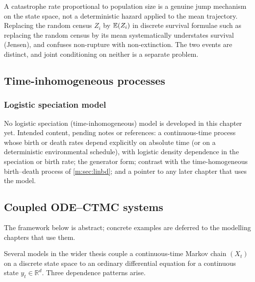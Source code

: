 \begin{remark}
\label{m:rem:catastrophe-not-meanfield}
A catastrophe rate proportional to population size is a genuine jump mechanism on
the state space, not a deterministic hazard applied to the mean trajectory. Replacing
the random census $Z_i$ by $\mathbb{E}\!\left(Z_i\right)$ in discrete survival formulae such as
replacing the random census by its mean systematically understates survival (Jensen), and confuses
non-rupture with non-extinction. The two events are distinct, and joint
conditioning on neither is a separate problem.
\end{remark}


\subsection{Time-inhomogeneous processes}
\label{m:sec:time-inhom}

\subsubsection{Logistic speciation model}
\label{m:sec:logistic-speciation}

\begin{remark}
\label{m:rem:logistic-todo}
No logistic speciation (time-inhomogeneous) model is developed in this chapter yet.
Intended content, pending notes or references: a continuous-time process whose birth
or death rates depend explicitly on absolute time (or on a deterministic environmental
schedule), with logistic density dependence in the speciation or birth rate; the
generator form; contrast with the time-homogeneous birth--death process of
\cref{m:sec:linbd}; and a pointer to any later chapter that uses the model.
\end{remark}

\subsection{Coupled ODE--CTMC systems}
\label{m:sec:coupled}

\begin{remark}
\label{m:rem:coupled-todo}
The framework below is abstract; concrete examples are deferred to the modelling
chapters that use them.
\end{remark}

Several models in the wider thesis couple a continuous-time Markov chain \((X_t)\) on
a discrete state space to an ordinary differential equation for a continuous state
\(y_t\in\mathbb{R}^d\). Three dependence patterns arise.

